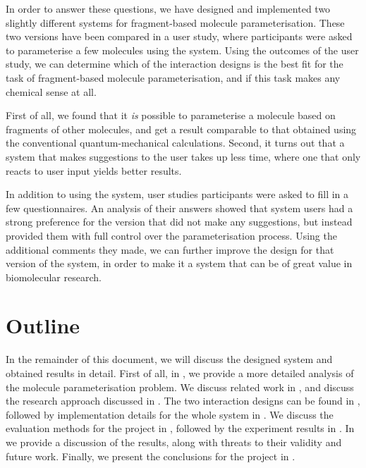 In order to answer these questions, we have designed and implemented two slightly different systems for fragment-based molecule parameterisation. These two versions have been compared in a user study, where participants were asked to parameterise a few molecules using the system. Using the outcomes of the user study, we can determine which of the interaction designs is the best fit for the task of fragment-based molecule parameterisation, and if this task makes any chemical sense at all.

First of all, we found that it \emph{is} possible to parameterise a molecule based on fragments of other molecules, and get a result comparable to that obtained using the conventional quantum-mechanical calculations. Second, it turns out that a system that makes suggestions to the user takes up less time, where one that only reacts to user input yields better results.

In addition to using the system, user studies participants were asked to fill in a few questionnaires. An analysis of their answers showed that system users had a strong preference for the version that did not make any suggestions, but instead provided them with full control over the parameterisation process. Using the additional comments they made, we can further improve the design for that version of the system, in order to make it a system that can be of great value in biomolecular research.



\section{Outline}
In the remainder of this document, we will discuss the designed system and obtained results in detail. First of all, in , we provide a more detailed analysis of the molecule parameterisation problem. We discuss related work in , and discuss the research approach discussed in . The two interaction designs can be found in , followed by implementation details for the whole system in . We discuss the evaluation methods for the project in , followed by the experiment results in . In  we provide a discussion of the results, along with threats to their validity and future work. Finally, we present the conclusions for the project in .
